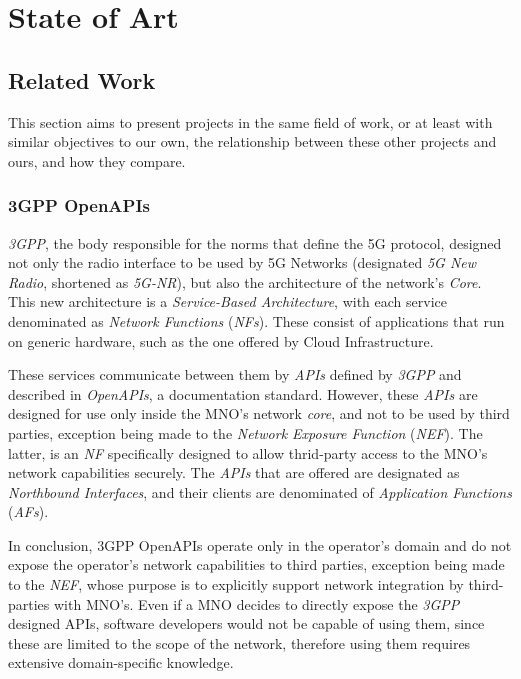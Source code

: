 \chapter{State of Art}

\section{Related Work}

This section aims to present projects in the same field of work,
or at least with similar objectives to our own, the relationship
between these other projects and ours, and how they compare.

\subsection{3GPP OpenAPIs}\label{sec:related_work_3gpp}

\emph{3GPP}, the body responsible for the norms that define the
5G protocol, designed not only the radio interface to be used by
5G Networks (designated \emph{5G New Radio}, shortened as
\emph{5G-NR}), but also the architecture of the network's
\emph{Core}. This new architecture is a \emph{Service-Based
Architecture}, with each service denominated as \emph{Network
Functions} (\emph{NFs}). These consist of applications that run
on generic hardware, such as the one offered by Cloud
Infrastructure.

These services communicate between them by \emph{APIs} defined by
\emph{3GPP} and described in \emph{OpenAPIs}, a documentation
standard. However, these \emph{APIs} are designed for use only
inside the MNO's network \emph{core}, and not to be used by third
parties, exception being made to the \emph{Network Exposure
Function} (\emph{NEF}). The latter, is an \emph{NF} specifically
designed to allow thrid-party access to the MNO's network
capabilities securely. The \emph{APIs} that are
offered are designated as \emph{Northbound Interfaces}, and their
clients are denominated of \emph{Application Functions}
(\emph{AFs}).

In conclusion, 3GPP OpenAPIs operate only in the operator's
domain and do not expose the operator's network capabilities to
third parties, exception being made to the \emph{NEF}, whose
purpose is to explicitly support network integration by
third-parties with MNO's. Even if a MNO decides to directly
expose the \emph{3GPP} designed APIs, software developers would
not be capable of using them, since these are limited to the
scope of the network, therefore using them requires extensive
domain-specific knowledge.

